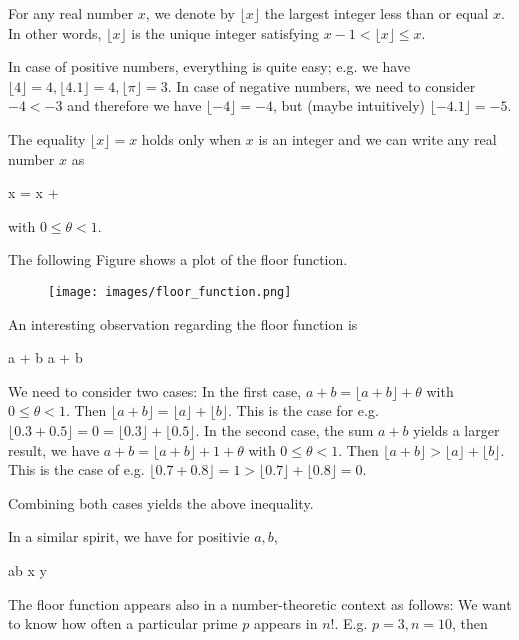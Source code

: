 
For any real number $x$, we denote by $\lfloor x \rfloor$ the largest integer less than or equal $x$. In other words, $\lfloor x \rfloor$ is the unique integer satisfying $x-1 < \lfloor x \rfloor \leq x$.

In case of positive numbers, everything is quite easy; e.g. we have $\lfloor 4 \rfloor = 4, \lfloor 4.1 \rfloor = 4, \lfloor \pi \rfloor = 3$. In case of negative numbers, we need to consider $-4 < -3$ and therefore we have $\lfloor -4 \rfloor = -4$, but (maybe intuitively) $\lfloor -4.1 \rfloor = -5$.

The equality $\lfloor x \rfloor = x$ holds only when $x$ is an integer and we can write any real number $x$ as

\bee
x = \lfloor x \rfloor + \theta
\eee

with $0 \leq \theta < 1$.

The following Figure shows a plot of the floor function.

\begin{figure}[H]
    \centering
    \texttt{[image: images/floor\_function.png]}
\end{figure}


An interesting observation regarding the floor function is

\bee
\lfloor a + b \rfloor \geq \lfloor a \rfloor + \lfloor b \rfloor
\eee

We need to consider two cases: In the first case, $a + b = \lfloor a + b \rfloor + \theta$ with $0 \leq \theta < 1$. Then $\lfloor a+b \rfloor = \lfloor a \rfloor + \lfloor b \rfloor$. This is the case for e.g. $\lfloor 0.3 + 0.5 \rfloor = 0 = \lfloor 0.3 \rfloor + \lfloor 0.5 \rfloor$. In the second case, the sum $a + b$ yields a larger result, we have $a + b = \lfloor a + b\rfloor + 1 + \theta$ with $0 \leq \theta < 1$. Then $\lfloor a + b \rfloor > \lfloor a \rfloor + \lfloor b \rfloor$. This is the case of e.g. $\lfloor 0.7 + 0.8 \rfloor = 1 > \lfloor 0.7 \rfloor + \lfloor 0.8 \rfloor = 0$.

Combining both cases yields the above inequality.

In a similar spirit, we have for positivie $a, b$,

\bee
\lfloor ab \rfloor \geq \lfloor x \rfloor \lfloor y \rfloor
\eee

The floor function appears also in a number-theoretic context as follows: We want to know how often a particular prime $p$ appears in $n!$. E.g. $p = 3, n = 10$, then

